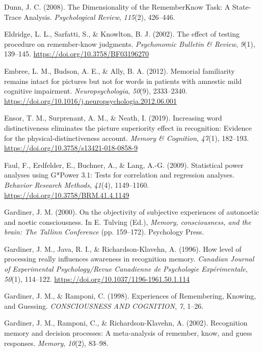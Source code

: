 \documentclass[
  11pt,
]{article}
\begin{document}
\leavevmode\hypertarget{ref-dunn2008}{}%
Dunn, J. C. (2008). The Dimensionality of the RememberKnow Task: A
State-Trace Analysis. \emph{Psychological Review}, \emph{115}(2),
426--446.

\leavevmode\hypertarget{ref-eldridge2002}{}%
Eldridge, L. L., Sarfatti, S., \& Knowlton, B. J. (2002). The effect of
testing procedure on remember-know judgments. \emph{Psychonomic Bulletin
\& Review}, \emph{9}(1), 139--145.
\url{https://doi.org/10.3758/BF03196270}

\leavevmode\hypertarget{ref-embree2012}{}%
Embree, L. M., Budson, A. E., \& Ally, B. A. (2012). Memorial
familiarity remains intact for pictures but not for words in patients
with amnestic mild cognitive impairment. \emph{Neuropsychologia},
\emph{50}(9), 2333--2340.
\url{https://doi.org/10.1016/j.neuropsychologia.2012.06.001}

\leavevmode\hypertarget{ref-ensor2019b}{}%
Ensor, T. M., Surprenant, A. M., \& Neath, I. (2019). Increasing word
distinctiveness eliminates the picture superiority effect in
recognition: Evidence for the physical-distinctiveness account.
\emph{Memory \& Cognition}, \emph{47}(1), 182--193.
\url{https://doi.org/10.3758/s13421-018-0858-9}

\leavevmode\hypertarget{ref-faul2009}{}%
Faul, F., Erdfelder, E., Buchner, A., \& Lang, A.-G. (2009). Statistical
power analyses using G*Power 3.1: Tests for correlation and regression
analyses. \emph{Behavior Research Methods}, \emph{41}(4), 1149--1160.
\url{https://doi.org/10.3758/BRM.41.4.1149}

\leavevmode\hypertarget{ref-gardiner2000}{}%
Gardiner, J. M. (2000). On the objectivity of subjective experiences of
autonoetic and noetic consciousness. In E. Tulving (Ed.), \emph{Memory,
consciousness, and the brain: The Tallinn Conference} (pp. 159--172).
Psychology Press.

\leavevmode\hypertarget{ref-gardiner1996}{}%
Gardiner, J. M., Java, R. I., \& Richardson-Klavehn, A. (1996). How
level of processing really influences awareness in recognition memory.
\emph{Canadian Journal of Experimental Psychology/Revue Canadienne de
Psychologie Expérimentale}, \emph{50}(1), 114--122.
\url{https://doi.org/10.1037/1196-1961.50.1.114}

\leavevmode\hypertarget{ref-gardiner1998}{}%
Gardiner, J. M., \& Ramponi, C. (1998). Experiences of Remembering,
Knowing, and Guessing. \emph{CONSCIOUSNESS AND COGNITION}, \emph{7},
1--26.

\leavevmode\hypertarget{ref-gardiner2002a}{}%
Gardiner, J. M., Ramponi, C., \& Richardson-Klavehn, A. (2002).
Recognition memory and decision processes: A meta-analysis of remember,
know, and guess responses. \emph{Memory}, \emph{10}(2), 83--98.
\end{document}
